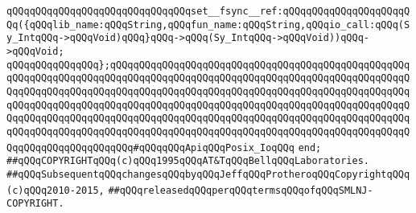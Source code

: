 \verb|qQQqqQQqqQQqqQQqqQQqqQQqqQQqqQQqset__fsync__ref:qQQqqQQqqQQqqQQqqQQqqQQq({qQQqlib_name:qQQqString,qQQqfun_name:qQQqString,qQQqio_call:qQQq(Sy_IntqQQq->qQQqVoid)qQQq}qQQq->qQQq(Sy_IntqQQq->qQQqVoid))qQQq->qQQqVoid;|\newline
\verb|qQQqqQQqqQQqqQQq};qQQqqQQqqQQqqQQqqQQqqQQqqQQqqQQqqQQqqQQqqQQqqQQqqQQqqQQqqQQqqQQqqQQqqQQqqQQqqQQqqQQqqQQqqQQqqQQqqQQqqQQqqQQqqQQqqQQqqQQqqQQqqQQqqQQqqQQqqQQqqQQqqQQqqQQqqQQqqQQqqQQqqQQqqQQqqQQqqQQqqQQqqQQqqQQqqQQqqQQqqQQqqQQqqQQqqQQqqQQqqQQqqQQqqQQqqQQqqQQqqQQqqQQqqQQqqQQqqQQqqQQqqQQqqQQqqQQqqQQqqQQqqQQqqQQqqQQqqQQqqQQqqQQqqQQqqQQqqQQqqQQqqQQqqQQqqQQqqQQqqQQqqQQqqQQqqQQqqQQqqQQqqQQqqQQqqQQqqQQqqQQqqQQqqQQqqQQqqQQqqQQqqQQqqQQqqQQqqQQqqQQq#qQQqqQQqApiqQQqPosix_IoqQQq|\newline
\newline
\verb|end;|\newline
\newline
\verb|##qQQqCOPYRIGHTqQQq(c)qQQq1995qQQqAT&TqQQqBellqQQqLaboratories.|\newline
\verb|##qQQqSubsequentqQQqchangesqQQqbyqQQqJeffqQQqProtheroqQQqCopyrightqQQq(c)qQQq2010-2015,|\newline
\verb|##qQQqreleasedqQQqperqQQqtermsqQQqofqQQqSMLNJ-COPYRIGHT.|\newline

